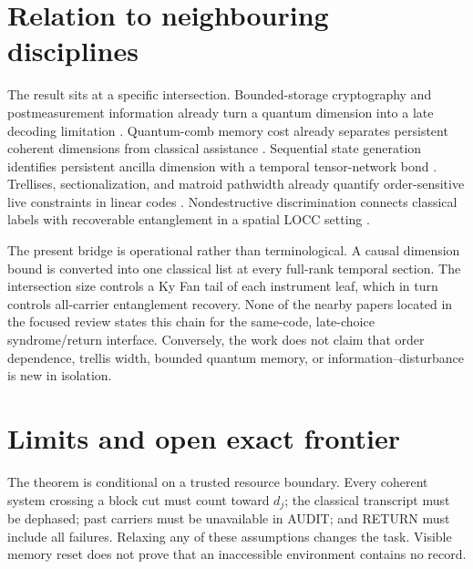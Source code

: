\documentclass[10pt,twocolumn]{article}
\theoremstyle{remark}
\begin{document}
\section{Relation to neighbouring disciplines}

The result sits at a specific intersection. Bounded-storage cryptography and
postmeasurement information already turn a quantum dimension into a late
decoding limitation \cite{konig2005power,ballester2008postmeasurement}.
Quantum-comb memory cost already separates persistent coherent dimensions
from classical assistance \cite{bisio2012memory,ohst2026memory}. Sequential
state generation identifies persistent ancilla dimension with a temporal
tensor-network bond \cite{li2022emitters}. Trellises, sectionalization, and
matroid pathwidth already quantify order-sensitive live constraints in linear
codes \cite{forney1994trellis,lafourcade1996sectionalization,kashyap2008pathwidth}.
Nondestructive discrimination connects classical labels with recoverable
entanglement in a spatial LOCC setting \cite{bilash2024nondestructive,lim2025local}.

The present bridge is operational rather than terminological. A causal
dimension bound is converted into one classical list at every full-rank
temporal section. The intersection size controls a Ky Fan tail of each
instrument leaf, which in turn controls all-carrier entanglement recovery.
None of the nearby papers located in the focused review states this chain for
the same-code, late-choice syndrome/return interface. Conversely, the work
does not claim that order dependence, trellis width, bounded quantum memory,
or information--disturbance is new in isolation.

\section{Limits and open exact frontier}

The theorem is conditional on a trusted resource boundary. Every coherent
system crossing a block cut must count toward $d_j$; the classical transcript
must be dephased; past carriers must be unavailable in AUDIT; and RETURN must
include all failures. Relaxing any of these assumptions changes the task.
Visible memory reset does not prove that an inaccessible environment contains
no record.
\end{document}
